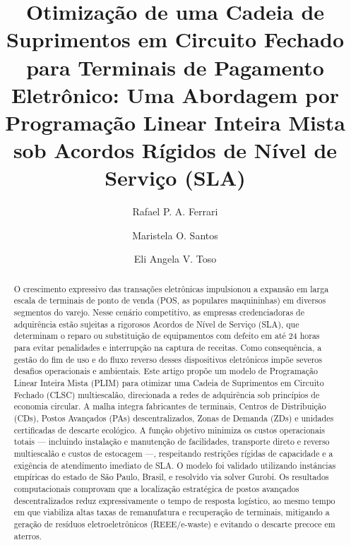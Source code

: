 \documentclass[preprint,12pt,authoryear]{elsarticle}
\begin{document}
\begin{frontmatter}

\title{Otimização de uma Cadeia de Suprimentos em Circuito Fechado para Terminais de Pagamento Eletrônico: Uma Abordagem por Programação Linear Inteira Mista sob Acordos Rígidos de Nível de Serviço (SLA)}

\author[icmc]{Rafael P. A. Ferrari}

\author[icmc]{Maristela O. Santos}

\author[ufscar]{Eli Angela V. Toso}



\begin{abstract}
O crescimento expressivo das transações eletrônicas impulsionou a expansão em larga escala de terminais de ponto de venda (POS, as populares maquininhas) em diversos segmentos do varejo. Nesse cenário competitivo, as empresas credenciadoras de adquirência estão sujeitas a rigorosos Acordos de Nível de Serviço (SLA), que determinam o reparo ou substituição de equipamentos com defeito em até 24 horas para evitar penalidades e interrupção na captura de receitas. Como consequência, a gestão do fim de uso e do fluxo reverso desses dispositivos eletrônicos impõe severos desafios operacionais e ambientais. Este artigo propõe um modelo de Programação Linear Inteira Mista (PLIM) para otimizar uma Cadeia de Suprimentos em Circuito Fechado (CLSC) multiescalão, direcionada a redes de adquirência sob princípios de economia circular. A malha integra fabricantes de terminais, Centros de Distribuição (CDs), Postos Avançados (PAs) descentralizados, Zonas de Demanda (ZDs) e unidades certificadas de descarte ecológico. A função objetivo minimiza os custos operacionais totais — incluindo instalação e manutenção de facilidades, transporte direto e reverso multiescalão e custos de estocagem —, respeitando restrições rígidas de capacidade e a exigência de atendimento imediato de SLA. O modelo foi validado utilizando instâncias empíricas do estado de São Paulo, Brasil, e resolvido via solver Gurobi. Os resultados computacionais comprovam que a localização estratégica de postos avançados descentralizados reduz expressivamente o tempo de resposta logístico, ao mesmo tempo em que viabiliza altas taxas de remanufatura e recuperação de terminais, mitigando a geração de resíduos eletroeletrônicos (REEE/e-waste) e evitando o descarte precoce em aterros.
\end{abstract}


\end{frontmatter}
\end{document}
